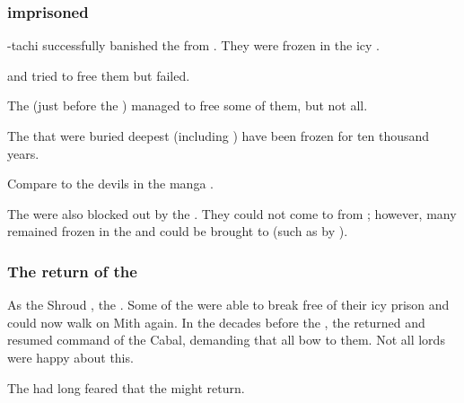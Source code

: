\subsubsection{\Banelords{} imprisoned}
\index{\CrystalSphere}%
\Tiamat-tachi successfully banished the \banelords{} from \Miith{}. 
They were frozen in the icy . 

\Semiza{} and \Thanatzil{} tried to free them but failed. 

The \resphain{} (just before the \Secondbanewar) managed to free some of them, but not all. 

The \banelords{} that were buried deepest (including \Daggerrain) have been frozen for ten thousand years. 

Compare to the devils in the manga \cite{NagaiGo:Devilman}. 

The \lesserbanes{} were also blocked out by the \CrystalSphere. 
They could not come to \Miith{} from \Erebos; however, many \lesserbanes{} remained frozen in the \CrystalSphere{} and could be brought to \Miith{} (such as by ). 






\subsubsection{The return of the \banelords}
\index{\CrystalSphere}%
As the Shroud , the \CrystalSphere{} . 
Some of the \banelords{} were able to break free of their icy prison and could now walk on Mith again. 
In the decades before the , the \banelords{} returned and resumed command of the Cabal, demanding that all \resphain{} bow to them. 
Not all \resphan{} lords were happy about this. 

The \dragons{} had long feared that the \banelords{} might return. 










